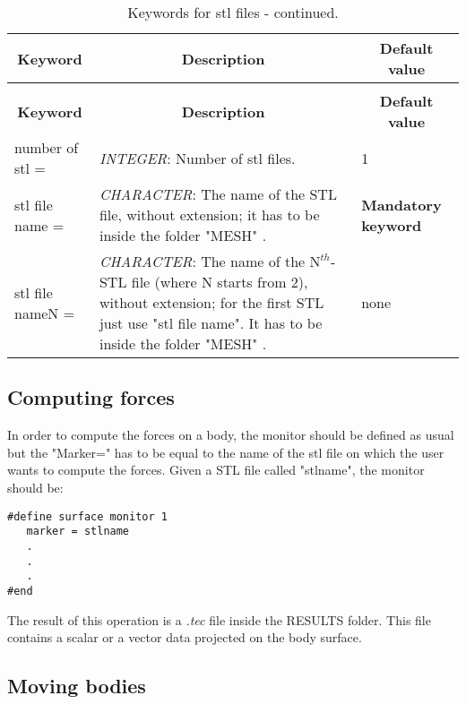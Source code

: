\documentclass[a4paper,10pt]{report}
\begin{document}
\begin{longtable}{|p{4cm}|p{10cm}|p{2.2cm}|}
\caption{Keywords for stl files.} \label{tab:IBMstl} \\
\hline
\multicolumn{1}{|c|}{\textbf{Keyword}} & \multicolumn{1}{c|}{\textbf{Description}} & \multicolumn{1}{c|}{\textbf{Default value}} \\ \hline
\endfirsthead

\caption{Keywords for stl files - continued.} \\
\hline
\multicolumn{1}{|c|}{\textbf{Keyword}} & \multicolumn{1}{c|}{\textbf{Description}} & \multicolumn{1}{c|}{\textbf{Default value}} \\ \hline
\endhead

number of stl = & \textit{INTEGER}: Number of stl files. & 1 \\ \hline

stl file name = & \textit{CHARACTER}: The name of the STL file, without extension; it has to be inside the folder "MESH" . & \textbf{Mandatory keyword} \\ \hline

stl file nameN = & \textit{CHARACTER}: The name of the $\mathrm{N}^{th}$-STL file (where N starts from 2), without extension; for the first STL just use "stl file name". It has to be inside the folder "MESH" . & none \\ \hline
 

\end{longtable}


\subsection{Computing forces}

In order to compute the forces on a body, the monitor should be defined as usual but the "Marker=" has to be equal to the name of the stl file on which the user wants to compute the forces. Given a STL file called "stlname", the monitor should be:
\begin{lstlisting}
#define surface monitor 1
   marker = stlname
   .
   .
   .
#end
\end{lstlisting}
The result of this operation is a \textit{.tec} file inside the RESULTS folder. This file contains a scalar or a vector data projected on the body surface. 

\subsection{Moving bodies}
\end{document}
